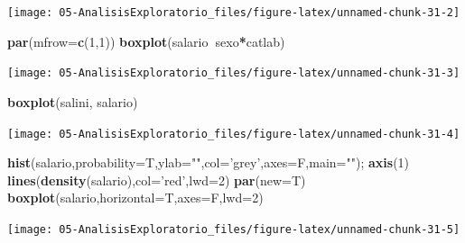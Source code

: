 \documentclass[]{book}
\newenvironment{Shaded}{\begin{snugshade}}{\end{snugshade}}
\newcommand{\KeywordTok}[1]{\textcolor[rgb]{0.13,0.29,0.53}{\textbf{#1}}}
\newcommand{\DataTypeTok}[1]{\textcolor[rgb]{0.13,0.29,0.53}{#1}}
\newcommand{\DecValTok}[1]{\textcolor[rgb]{0.00,0.00,0.81}{#1}}
\newcommand{\StringTok}[1]{\textcolor[rgb]{0.31,0.60,0.02}{#1}}
\newcommand{\OperatorTok}[1]{\textcolor[rgb]{0.81,0.36,0.00}{\textbf{#1}}}
\newcommand{\NormalTok}[1]{#1}
\begin{document}
\begin{center}\texttt{[image: 05-AnalisisExploratorio\_files/figure-latex/unnamed-chunk-31-2]} \end{center}

\begin{Shaded}
\begin{Highlighting}[]
\KeywordTok{par}\NormalTok{(}\DataTypeTok{mfrow=}\KeywordTok{c}\NormalTok{(}\DecValTok{1}\NormalTok{,}\DecValTok{1}\NormalTok{))}
\KeywordTok{boxplot}\NormalTok{(salario}\OperatorTok{~}\NormalTok{sexo}\OperatorTok{*}\NormalTok{catlab)}
\end{Highlighting}
\end{Shaded}

\begin{center}\texttt{[image: 05-AnalisisExploratorio\_files/figure-latex/unnamed-chunk-31-3]} \end{center}

\begin{Shaded}
\begin{Highlighting}[]
\KeywordTok{boxplot}\NormalTok{(salini, salario)}
\end{Highlighting}
\end{Shaded}

\begin{center}\texttt{[image: 05-AnalisisExploratorio\_files/figure-latex/unnamed-chunk-31-4]} \end{center}

\begin{Shaded}
\begin{Highlighting}[]
\KeywordTok{hist}\NormalTok{(salario,}\DataTypeTok{probability=}\NormalTok{T,}\DataTypeTok{ylab=}\StringTok{""}\NormalTok{,}\DataTypeTok{col=}\StringTok{'grey'}\NormalTok{,}\DataTypeTok{axes=}\NormalTok{F,}\DataTypeTok{main=}\StringTok{""}\NormalTok{); }\KeywordTok{axis}\NormalTok{(}\DecValTok{1}\NormalTok{)}
\KeywordTok{lines}\NormalTok{(}\KeywordTok{density}\NormalTok{(salario),}\DataTypeTok{col=}\StringTok{'red'}\NormalTok{,}\DataTypeTok{lwd=}\DecValTok{2}\NormalTok{)}
\KeywordTok{par}\NormalTok{(}\DataTypeTok{new=}\NormalTok{T)}
\KeywordTok{boxplot}\NormalTok{(salario,}\DataTypeTok{horizontal=}\NormalTok{T,}\DataTypeTok{axes=}\NormalTok{F,}\DataTypeTok{lwd=}\DecValTok{2}\NormalTok{)}
\end{Highlighting}
\end{Shaded}

\begin{center}\texttt{[image: 05-AnalisisExploratorio\_files/figure-latex/unnamed-chunk-31-5]} \end{center}
\end{document}
